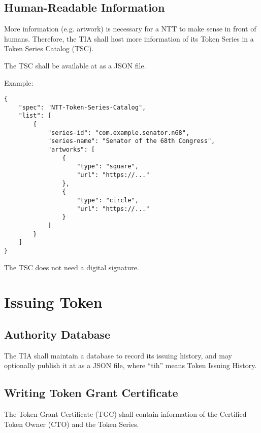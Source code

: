 \documentclass[a4paper,10pt]{article}
\begin{document}
\subsection{Human-Readable Information}

More information (e.g. artwork) is necessary for a NTT to make sense in front of humans.
Therefore, the TIA shall host more information of its Token Series in a Token Series Catalog (TSC).

The TSC shall be available at  as a JSON file.

Example:\pagebreak

\begin{lstlisting}
{
    "spec": "NTT-Token-Series-Catalog",
    "list": [
        {
            "series-id": "com.example.senator.n68",
            "series-name": "Senator of the 68th Congress",
            "artworks": [
                {
                    "type": "square",
                    "url": "https://..."
                },
                {
                    "type": "circle",
                    "url": "https://..."
                }
            ]
        }
    ]
}
\end{lstlisting}

The TSC does not need a digital signature.











\section{Issuing Token}


\subsection{Authority Database}

The TIA shall maintain a database to record its issuing history,
and may optionally publish it at  as a JSON file, where ``tih'' means Token Issuing History.


\subsection{Writing Token Grant Certificate}

The Token Grant Certificate (TGC) shall contain information of the Certified Token Owner (CTO) and the Token Series.
\end{document}
